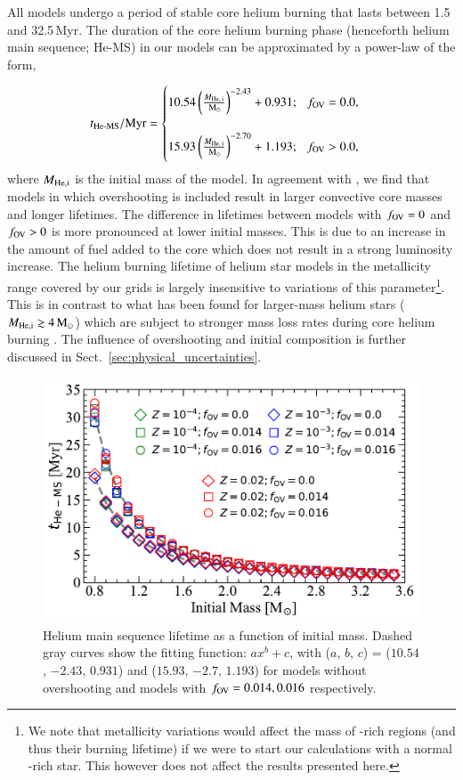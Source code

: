 \documentclass[main.tex]{subfiles}
\begin{document}
All models undergo a  period of stable core helium burning that lasts between 1.5 and 32.5\,Myr. The duration of the core helium burning phase (henceforth helium main sequence; He-MS) in our models can be approximated by a power-law of the form,

\begin{equation}\label{eq:tams_power_law}
    t_{\text{He-MS}}/{\rm Myr} = 
    \begin{cases}
        10.54 \left(\frac{M_{\text{He, i}}}{\mathrm{\,M_\odot}}\right)^{-2.43} + 0.931; \hspace{0.25cm} f_{\text{OV}} = 0.0, \\ \\
        15.93 \left(\frac{M_{\text{He, i}}}{\mathrm{\,M_\odot}}\right)^{-2.70} + 1.193; \hspace{0.25cm} f_{\text{OV}} > 0.0, 
    \end{cases}
\end{equation}
where $M_{\rm{He, i}}$ is the initial mass of the model. In agreement with \cite{Yan_2016}, we find that models in which overshooting is included result in larger convective core masses and longer lifetimes. 
The difference in lifetimes between models with $f_{\rm OV}=0$ and $f_{\rm OV}>0$ is more pronounced at lower 
initial masses. This is due to an increase in the amount of fuel added to the core which does not result in a 
strong luminosity increase. The helium burning lifetime of helium star models in the metallicity range covered by our grids is largely insensitive to variations of this parameter\footnote{We note that metallicity variations would affect the mass of -rich regions (and thus their burning lifetime) if we were to start our calculations with a normal -rich star. This however does not affect the results presented here.}. This is in contrast to what has been found for larger-mass helium stars ($M_{\rm{He, i}} \gtrsim 4\mathrm{\,M_\odot}$) which are subject to stronger mass loss rates during core helium burning \citep{Aguilera-Dena:2021abc}. The influence of overshooting and initial composition is further discussed in Sect.~\ref{sec:physical_uncertainties}. 


\begin{figure}[h!]
    \centering
    \includegraphics[width=0.5\columnwidth]{figures/chapter2/tams/hetams_vs_mass.pdf}
    \caption{Helium main sequence lifetime as a function of initial mass. Dashed gray curves show the fitting function: $ax^b + c$, with ($a$, $b$, $c$) = ($10.54$, $-2.43$, $0.931$) and ($15.93$, $-2.7$, $1.193$) for models without overshooting and models with $f_{\rm OV} = 0.014, 0.016$ respectively.}
    \label{fig:tams_vs_mass}
\end{figure}
\end{document}
